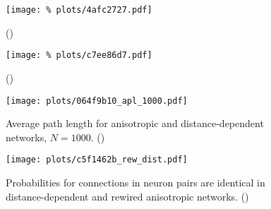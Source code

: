 
\begin{figure}[H]
  \centering
  \texttt{[image: \%
    plots/4afc2727.pdf]}
  \caption{()}
  \label{suppfig:rew_stats}
\end{figure}



\begin{figure}[H]
  \centering
  \texttt{[image: \%
    plots/c7ee86d7.pdf]}
  \caption{()}
  \label{suppfig:out_degree}
\end{figure}


\begin{figure}[H]
  \centering
  \texttt{[image: plots/064f9b10\_apl\_1000.pdf]}
  \caption{Average path length for anisotropic and distance-dependent
    networks, $N=1000$. ()} %
  \label{suppfig:small_world}
\end{figure}


\begin{figure}[H]
  \centering
  \texttt{[image: plots/c5f1462b\_rew\_dist.pdf]}
  \caption{Probabilities for connections in neuron pairs are identical
    in distance-dependent and rewired anisotropic
    networks. ()} %
  \label{suppfig:two_neurons_dist_rew}
  \end{figure}


